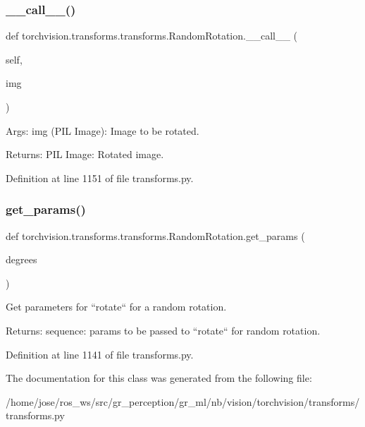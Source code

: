 \subsubsection{\texorpdfstring{\+\_\+\+\_\+call\+\_\+\+\_\+()}{\_\_call\_\_()}}
{\footnotesize\ttfamily def torchvision.\+transforms.\+transforms.\+Random\+Rotation.\+\_\+\+\_\+call\+\_\+\+\_\+ (\begin{DoxyParamCaption}\item[{}]{self,  }\item[{}]{img }\end{DoxyParamCaption})}

\begin{DoxyVerb}Args:
    img (PIL Image): Image to be rotated.

Returns:
    PIL Image: Rotated image.
\end{DoxyVerb}
 

Definition at line 1151 of file transforms.\+py.

\mbox{\label{classtorchvision_1_1transforms_1_1transforms_1_1RandomRotation_a6932f969e642e146b9517b2df193b317}} 
\subsubsection{\texorpdfstring{get\+\_\+params()}{get\_params()}}
{\footnotesize\ttfamily def torchvision.\+transforms.\+transforms.\+Random\+Rotation.\+get\+\_\+params (\begin{DoxyParamCaption}\item[{}]{degrees }\end{DoxyParamCaption})\hspace{0.3cm}{\ttfamily [static]}}

\begin{DoxyVerb}Get parameters for ``rotate`` for a random rotation.

Returns:
    sequence: params to be passed to ``rotate`` for random rotation.
\end{DoxyVerb}
 

Definition at line 1141 of file transforms.\+py.



The documentation for this class was generated from the following file\+:\begin{DoxyCompactItemize}
\item 
/home/jose/ros\+\_\+ws/src/gr\+\_\+perception/gr\+\_\+ml/nb/vision/torchvision/transforms/transforms.\+py\end{DoxyCompactItemize}
